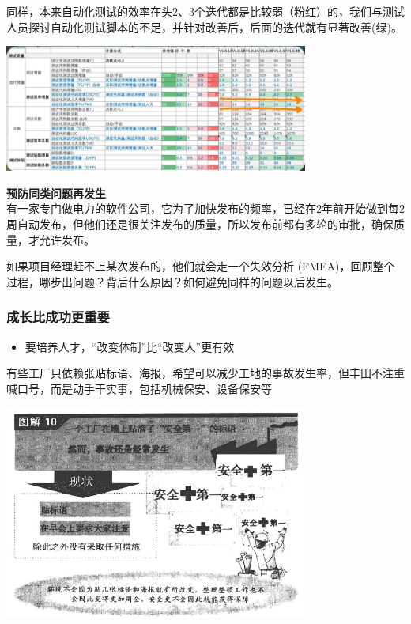 同样，本来自动化测试的效率在头2、3个迭代都是比较弱（粉红）的，我们与测试人员探讨自动化测试脚本的不足，并针对改善后，后面的迭代就有显著改善(绿)。


\includegraphics[width=10cm]{陈爱明p17.jpg}

\textbf{预防同类问题再发生}\\
有一家专门做电力的软件公司，它为了加快发布的频率，已经在2年前开始做到每2周自动发布，但他们还是很关注发布的质量，所以发布前都有多轮的审批，确保质量，才允许发布。

如果项目经理赶不上某次发布的，他们就会走一个失效分析
(FMEA)，回顾整个过程，哪步出问题？背后什么原因？如何避免同样的问题以后发生。

\hypertarget{ux6210ux957fux6bd4ux6210ux529fux66f4ux91cdux8981}{%
\subsubsection{成长比成功更重要}\label{ux6210ux957fux6bd4ux6210ux529fux66f4ux91cdux8981}}

\begin{itemize}
\tightlist
\item
  要培养人才，``改变体制''比``改变人''更有效
\end{itemize}

有些工厂只依赖张贴标语、海报，希望可以减少工地的事故发生率，但丰田不注重喊口号，而是动手干实事，包括机械保安、设备保安等


\includegraphics[width=10cm]{ft_223_1.jpg}


